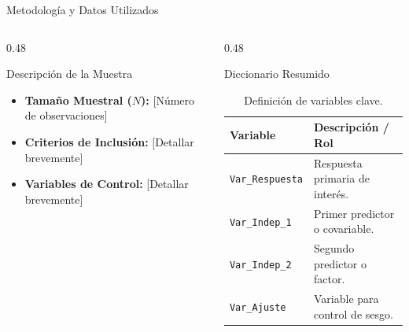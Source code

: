 \documentclass[aspectratio=169, xcolor={dvipsnames}, 8pt, spanish]{beamer}
\begin{document}
\begin{frame}{Metodología y Datos Utilizados}

\begin{columns}[T,onlytextwidth]
\begin{column}{0.48\textwidth}
\begin{block}{Descripción de la Muestra}
    \begin{itemize}
        \item \textbf{Tamaño Muestral ($N$):} [Número de observaciones]
        \item \textbf{Criterios de Inclusión:} [Detallar brevemente]
        \item \textbf{Variables de Control:} [Detallar brevemente]
    \end{itemize}
\end{block}
\end{column}
\begin{column}{0.48\textwidth}
\begin{block}{Diccionario Resumido}
    \begin{table}[]
    \scriptsize
    \begin{tabularx}{\textwidth}{lX}
    \toprule
    \textbf{Variable} & \textbf{Descripción / Rol} \\
    \midrule
    \texttt{Var\_Respuesta} & Respuesta primaria de interés. \\
    \texttt{Var\_Indep\_1} & Primer predictor o covariable. \\
    \texttt{Var\_Indep\_2} & Segundo predictor o factor. \\
    \texttt{Var\_Ajuste} & Variable para control de sesgo. \\
    \bottomrule
    \end{tabularx}
    \caption{Definición de variables clave.}
    \end{table}
\end{block}
\end{column}
\end{columns}

\end{frame}
\end{document}
